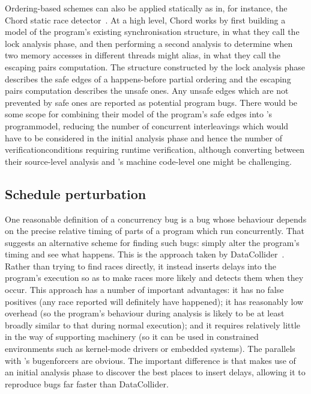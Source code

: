 Ordering-based schemes can also be applied statically as in, for
instance, the Chord static race detector~\cite{Naik2006}.  At a high
level, Chord works by first building a model of the program's existing
synchronisation structure, in what they call the lock analysis phase,
and then performing a second analysis to determine when two memory
accesses in different threads might alias, in what they call the
escaping pairs computation.  The structure constructed by the lock
analysis phase describes the safe edges of a happens-before partial
ordering and the escaping pairs computation describes the unsafe ones.
Any unsafe edges which are not prevented by safe ones are reported as
potential program bugs.  There would be some scope for combining their
model of the program's safe edges into {\technique}'s
\gls{programmodel}, reducing the number of concurrent interleavings
which would have to be considered in the initial analysis phase and
hence the number of \glspl{verificationcondition} requiring runtime
verification, although converting between their source-level analysis
and {\technique}'s machine code-level one might be challenging.

\subsection{Schedule perturbation}

One reasonable definition of a concurrency bug is a bug whose
behaviour depends on the precise relative timing of parts of a program
which run concurrently.  That suggests an alternative scheme for
finding such bugs: simply alter the program's timing and see what
happens.  This is the approach taken by
DataCollider~\cite{Erickson2010}.  Rather than trying to find races
directly, it instead inserts delays into the program's execution so as
to make races more likely and detects them when they occur.  This
approach has a number of important advantages: it has no false
positives (any race reported will definitely have happened); it has
reasonably low overhead (so the program's behaviour during analysis is
likely to be at least broadly similar to that during normal
execution); and it requires relatively little in the way of supporting
machinery (so it can be used in constrained environments such as
kernel-mode drivers or embedded systems).  The parallels with
{\technique}'s \glspl{bugenforcer} are obvious.  The important
difference is that {\technique} makes use of an initial analysis phase
to discover the best places to insert delays, allowing it to reproduce
bugs far faster than DataCollider.


